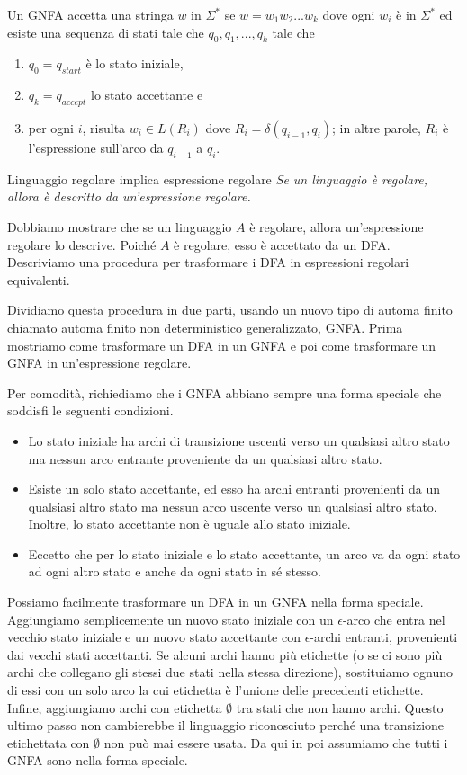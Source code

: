 Un GNFA accetta una stringa $w$ in $\Sigma^*$ se $w= w_{1}w_{2}...w_k$ dove ogni $w_{i}$ è in $\Sigma^*$ ed esiste una sequenza di stati tale che $q_{0}, q_{1},..., q_k$ tale che
\begin{enumerate}
    \item $q_{0}=q_{start}$ è lo stato iniziale,
    \item $q_{k}=q_{accept}$ lo stato accettante e
    \item per ogni $i$, risulta $w_{i} \in L(R_{i})$ dove $R_i = \delta(q_{i - 1}, q_i)$; in altre parole, $R_{i}$ è l'espressione sull'arco da $q_{i-1}$ a $q_i$.
\end{enumerate}

\begin{Lemma}{Linguaggio regolare implica espressione regolare}{}
\textit{Se un linguaggio è regolare, allora è descritto da un'espressione regolare.}

\begin{osservation}
Dobbiamo mostrare che se un linguaggio $A$ è regolare, allora un'espressione regolare lo descrive. Poiché $A$ è regolare, esso è accettato da un DFA. Descriviamo una procedura per trasformare i DFA in espressioni regolari equivalenti.    
\end{osservation}

Dividiamo questa procedura in due parti, usando un nuovo tipo di automa finito chiamato automa finito non deterministico generalizzato, GNFA. Prima mostriamo come trasformare un DFA in un GNFA e poi come trasformare un GNFA in un'espressione regolare.

Per comodità, richiediamo che i GNFA abbiano sempre una forma speciale che soddisfi le seguenti condizioni.
\begin{itemize}
    \item Lo stato iniziale ha archi di transizione uscenti verso un qualsiasi altro stato ma nessun arco entrante proveniente da un qualsiasi altro stato.
    \item Esiste un solo stato accettante, ed esso ha archi entranti provenienti da un qualsiasi altro stato ma nessun arco uscente verso un qualsiasi altro stato. Inoltre, lo stato accettante non è uguale allo stato iniziale.
    \item Eccetto che per lo stato iniziale e lo stato accettante, un arco va da ogni stato ad ogni altro stato e anche da ogni stato in sé stesso.
\end{itemize}

Possiamo facilmente trasformare un DFA in un GNFA nella forma speciale. Aggiungiamo semplicemente un nuovo stato iniziale con un $\epsilon$-arco che entra nel vecchio stato iniziale e un nuovo stato accettante con $\epsilon$-archi entranti, provenienti dai vecchi stati accettanti. Se alcuni archi hanno più etichette (o se ci sono più archi che collegano gli stessi due stati nella stessa direzione), sostituiamo ognuno di essi con un solo arco la cui etichetta è l'unione delle precedenti etichette. Infine, aggiungiamo archi con etichetta $\emptyset$ tra stati che non hanno archi. Questo ultimo passo non cambierebbe il linguaggio riconosciuto perché una transizione etichettata con $\emptyset$ non può mai essere usata. Da qui in poi assumiamo che tutti i GNFA sono nella forma speciale.


\end{Lemma}
